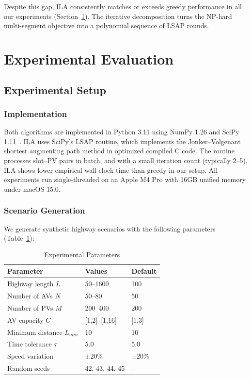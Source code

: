 \documentclass[conference]{IEEEtran}
\begin{document}
Despite this gap, ILA consistently matches or exceeds greedy performance in all our experiments (Section~\ref{sec:experiments}). The iterative decomposition turns the NP-hard multi-segment objective into a polynomial sequence of LSAP rounds.

\section{Experimental Evaluation}
\label{sec:experiments}

\subsection{Experimental Setup}

\subsubsection{Implementation}

Both algorithms are implemented in Python 3.11 using NumPy 1.26 and SciPy 1.11~\cite{scipy2020}. ILA uses SciPy's LSAP routine, which implements the Jonker--Volgenant shortest augmenting path method in optimized compiled C code. The routine processes slot--PV pairs in batch, and with a small iteration count (typically 2--5), ILA shows lower empirical wall-clock time than greedy in our setup. All experiments run single-threaded on an Apple M4 Pro with 16GB unified memory under macOS 15.0.

\subsubsection{Scenario Generation}

We generate synthetic highway scenarios with the following parameters (Table~\ref{tab:params}):

\begin{table}[htbp]
\caption{Experimental Parameters}
\label{tab:params}
\centering
\begin{tabular}{lll}
\toprule
\textbf{Parameter} & \textbf{Values} & \textbf{Default} \\
\midrule
Highway length $L$ & 50--1600 & 100 \\
Number of AVs $N$ & 50--80 & 50 \\
Number of PVs $M$ & 200--400 & 200 \\
AV capacity $C$ & [1,2]--[1,16] & [1,3] \\
Minimum distance $L_{min}$ & 10 & 10 \\
Time tolerance $\tau$ & 5.0 & 5.0 \\
Speed variation & $\pm 20\%$ & $\pm 20\%$ \\
Random seeds & 42, 43, 44, 45 & -- \\
\bottomrule
\end{tabular}
\end{table}
\end{document}

